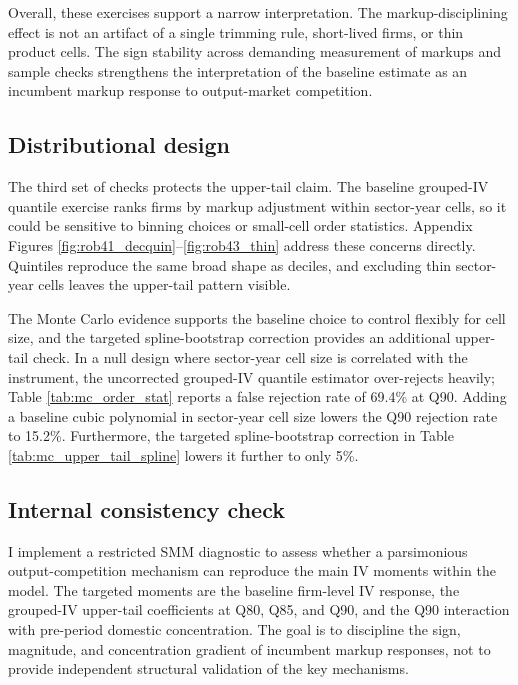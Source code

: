 \documentclass[12pt]{article}
\begin{document}
Overall, these exercises support a narrow interpretation. The markup-disciplining effect is not an artifact of a single trimming rule, short-lived firms, or thin product cells. The sign stability across demanding measurement of markups and sample checks strengthens the interpretation of the baseline estimate as an incumbent markup response to output-market competition.

\subsection{Distributional design}

The third set of checks protects the upper-tail claim. The baseline grouped-IV quantile exercise ranks firms by markup adjustment within sector-year cells, so it could be sensitive to binning choices or small-cell order statistics. Appendix Figures \ref{fig:rob41_decquin}--\ref{fig:rob43_thin} address these concerns directly. Quintiles reproduce the same broad shape as deciles, and excluding thin sector-year cells leaves the upper-tail pattern visible.

The Monte Carlo evidence supports the baseline choice to control flexibly for cell size, and the targeted spline-bootstrap correction provides an additional upper-tail check. In a null design where sector-year cell size is correlated with the instrument, the uncorrected grouped-IV quantile estimator over-rejects heavily; Table \ref{tab:mc_order_stat} reports a false rejection rate of 69.4\% at Q90. Adding a baseline cubic polynomial in sector-year cell size lowers the Q90 rejection rate to 15.2\%. Furthermore, the targeted spline-bootstrap correction in Table \ref{tab:mc_upper_tail_spline} lowers it further to only 5\%.

\subsection{Internal consistency check}
\label{sec:smm_validation}

I implement a restricted SMM diagnostic to assess whether a parsimonious output-competition mechanism can reproduce the main IV moments within the model. The targeted moments are the baseline firm-level IV response, the grouped-IV upper-tail coefficients at Q80, Q85, and Q90, and the Q90 interaction with pre-period domestic concentration. The goal is to discipline the sign, magnitude, and concentration gradient of incumbent markup responses, not to provide independent structural validation of the key mechanisms.
\end{document}
